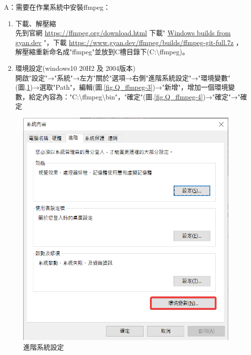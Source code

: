 \documentclass[14pt,a4paper]{report}  %
\begin{document}
\hspace{-1.7em}A：需要在作業系統中安裝ffmpeg：
\begin{enumerate}
\item 下載、解壓縮\\
先到官網 \href{https://ffmpeg.org/download.html}{https://ffmpeg.org/download.html} 下載" \href{https://www.gyan.dev/ffmpeg/builds/}{Windows builds from gyan.dev} "，下載 \href{https://www.gyan.dev/ffmpeg/builds/ffmpeg-git-full.7z}{https://www.gyan.dev/ffmpeg/builds/ffmpeg-git-full.7z} ，解壓縮重新命名成"ffmpeg"並放到C槽目錄下(C:$\setminus$ffmpeg)。
\item 環境設定(windows10 20H2 及 2004版本)\\
開啟"設定"→"系統"→左方"關於"選項→右側"進階系統設定"→"環境變數"(圖.\ref{fig.Q_ffmpeg-2})→選取"Path"，編輯(圖.\ref{fig.Q_ffmpeg-3})→"新增"，增加一個環境變數，給定內容為："C:$\setminus$ffmpeg$\setminus$bin"，"確定"(圖.\ref{fig.Q_ffmpeg-4})→"確定"→"確定\\
\end{enumerate}
\begin{figure}[hbt!]
\begin{center}
\includegraphics[width=15cm]{Q_ffmpeg-2}
\caption{\Large 進階系統設定}
\label{fig.Q_ffmpeg-2}
\end{center}
\end{figure}
\end{document}
